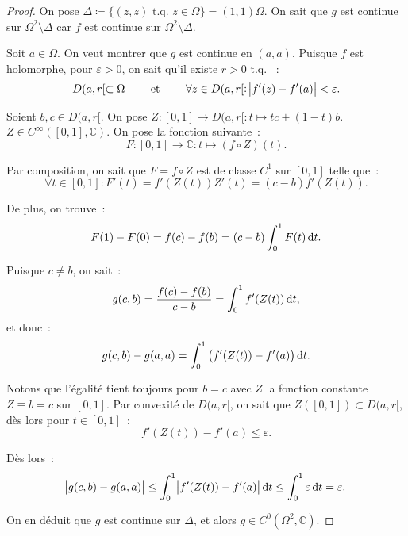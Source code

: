 \documentclass{report}
\theoremstyle{definition}
\theoremstyle{remark}
\numberwithin{equation}{section}
\newcommand{\C}{\mathbb C}
\newcommand{\tq}{\text{ t.q. }}
\begin{document}
			\begin{proof} On pose $\Delta \coloneqq \{(z, z) \tq z \in \Omega\} = (1, 1)\Omega$. On sait que $g$ est continue sur $\Omega^2 \setminus \Delta$
			car $f$ est continue sur $\Omega^2 \setminus \Delta$.

			Soit $a \in \Omega$. On veut montrer que $g$ est continue en $(a, a)$. Puisque $f$ est holomorphe, pour $\varepsilon > 0$, on sait qu'il existe $r > 0 \tq$~:
			\begin{equation}
				D(a, r[ \subset \Omega \qquad \text{ et } \qquad \forall z \in D(a, r[ : \abs {f'(z) - f'(a)} < \varepsilon.
			\end{equation}

			Soient $b, c \in D(a, r[$. On pose $Z : [0, 1] \to D(a, r[ : t \mapsto tc + (1-t)b$. $Z \in C^\infty([0, 1], \C)$. On pose la fonction suivante~:
			\begin{equation}
				F : [0, 1] \to \C : t \mapsto (f \circ Z)(t).
			\end{equation}

			Par composition, on sait que $F = f \circ Z$ est de classe $C^1$ sur $[0, 1]$ telle que~:
			\begin{equation}
				\forall t \in [0, 1] : F'(t) = f'(Z(t))Z'(t) = (c-b)f'(Z(t)).
			\end{equation}

			De plus, on trouve~:
			\begin{equation}
				F(1) - F(0) = f(c) - f(b) = (c-b)\int_0^1F(t)\dif t.
			\end{equation}

			Puisque $c \neq b$, on sait~:
			\begin{equation}
				g(c, b) = \frac {f(c)-f(b)}{c-b} = \int_0^1f'(Z(t))\dif t,
			\end{equation}
			et donc~:
			\begin{equation}
				g(c, b) - g(a, a) = \int_0^1\left(f'(Z(t)) - f'(a)\right)\dif t.
			\end{equation}

			Notons que l'égalité tient toujours pour $b=c$ avec $Z$ la fonction constante $Z \equiv b = c$ sur $[0, 1]$.
			Par convexité de $D(a, r[$, on sait que $Z([0, 1]) \subset D(a, r[$, dès lors pour $t \in [0, 1]$~:
			\begin{equation}
				f'(Z(t)) - f'(a) \leq \varepsilon.
			\end{equation}

			Dès lors~:
			\begin{equation}
				\abs {g(c, b) - g(a, a)} \leq \int_0^1\abs {f'(Z(t)) - f'(a)}\dif t \leq \int_0^1\varepsilon\dif t = \varepsilon.
			\end{equation}

			On en déduit que $g$ est continue sur $\Delta$, et alors $g \in C^0(\Omega^2, \C)$.
			\end{proof}
\end{document}
